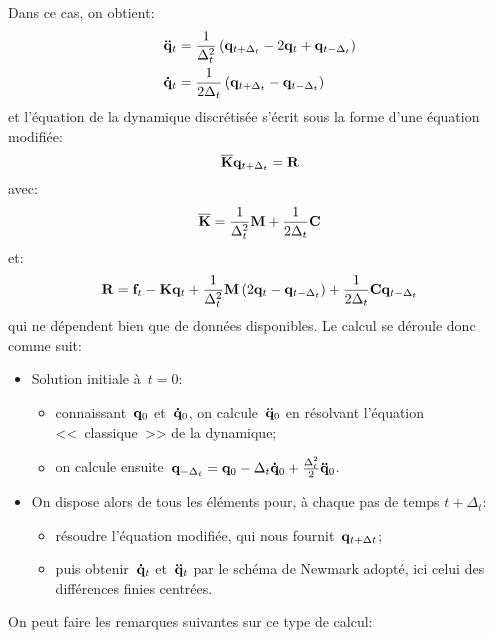 Dans ce cas, on obtient:
\begin{equation}\colorgreen
\begin{aligned}
&\VV{\ddot q}_t = \frac1{\Delta_t^2} \left( \VV{q}_{t+\Delta_t} - 2\VV{q}_t + \VV{q}_{t-\Delta_t}\right)\\
&\VV{\dot q}_t = \frac1{2\Delta_t}\left( \VV{q}_{t+\Delta_t} - \VV{q}_{t-\Delta_t}\right)
\end{aligned}
\end{equation}
et l'équation de la dynamique discrétisée s'écrit sous la forme d'une équation modifiée:
\begin{equation}\colorblue
\MM{\overline{K}} \VV{q}_{t+\Delta_t} = \VV{R}
\end{equation}
avec:
\begin{equation}\colorgreen
\MM{\overline{K}} = \frac1{\Delta_t^2}\MM{M}+\frac1{2\Delta_t}\MM{C}
\end{equation}
et:
\begin{equation}\colorgreen
\VV{R} = \VV{f}_t -\MM{K}\VV{q}_t + \frac1{\Delta_t^2}\MM{M}\left( 2\VV{q}_t -\VV{q}_{t-\Delta_t}\right)
+\frac1{2\Delta_t}\MM{C}\VV{q}_{t-\Delta_t}
\end{equation}
qui ne dépendent bien que de données disponibles.
\bigskip
Le calcul se déroule donc comme suit:
\begin{itemize}
  \item Solution initiale à~$t=0$:
	\begin{itemize}
	\item connaissant~$\VV{q}_0$ et~$\VV{\dot q}_0$, on calcule~$\VV{\ddot q}_0$ en résolvant
	l'équation <<~classique~>> de la dynamique;
	\item on calcule ensuite~$\VV{q}_{-\Delta_t} = \VV{q}_0 -\Delta_t \VV{\dot q}_0 + \frac{\Delta_t^2}2
	\VV{\ddot q}_0$.
	\end{itemize}
  \item On dispose alors de tous les éléments pour, à chaque pas de temps
	$t+\Delta_t$:
	\begin{itemize}
	\item résoudre l'équation modifiée, qui nous fournit~$\VV{q}_{t+\Delta t}$;
	\item puis obtenir~$\VV{\dot q}_t$ et~$\VV{\ddot q}_t$ par le schéma de Newmark adopté,
	ici celui des différences finies centrées.
	\end{itemize}
\end{itemize}
\bigskip
On peut faire les remarques suivantes sur ce type de calcul:
